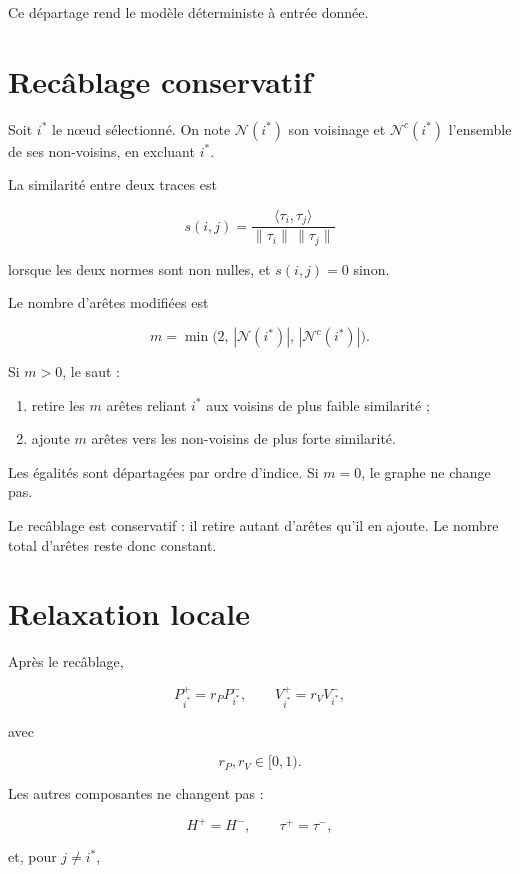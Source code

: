 Ce départage rend le modèle déterministe à entrée donnée.

\section{Recâblage conservatif}\label{t1-recablage-conservatif}

Soit \(i^\ast\) le nœud sélectionné. On note \(\mathcal N(i^\ast)\) son voisinage et \(\mathcal N^c(i^\ast)\) l'ensemble de ses non-voisins, en excluant \(i^\ast\).

La similarité entre deux traces est

\[
s(i,j)
=
\frac{\langle\tau_i,\tau_j\rangle}
{\|\tau_i\|\,\|\tau_j\|}
\]

lorsque les deux normes sont non nulles, et \(s(i,j)=0\) sinon.

Le nombre d'arêtes modifiées est

\[
m
=
\min\bigl(
2,\,
|\mathcal N(i^\ast)|,\,
|\mathcal N^c(i^\ast)|
\bigr).
\]

Si \(m>0\), le saut :

\begin{enumerate}
\def\labelenumi{\arabic{enumi}.}
\tightlist
\item
  retire les \(m\) arêtes reliant \(i^\ast\) aux voisins de plus faible similarité ;
\item
  ajoute \(m\) arêtes vers les non-voisins de plus forte similarité.
\end{enumerate}

Les égalités sont départagées par ordre d'indice. Si \(m=0\), le graphe ne change pas.

Le recâblage est conservatif : il retire autant d'arêtes qu'il en ajoute. Le nombre total d'arêtes reste donc constant.

\section{Relaxation locale}\label{t1-relaxation-locale}

Après le recâblage,

\[
P_{i^\ast}^+
=
r_P P_{i^\ast}^-,
\qquad
V_{i^\ast}^+
=
r_V V_{i^\ast}^-,
\]

avec

\[
r_P,r_V\in[0,1).
\]

Les autres composantes ne changent pas :

\[
H^+=H^-,
\qquad
\tau^+=\tau^-,
\]

et, pour \(j\neq i^\ast\),

